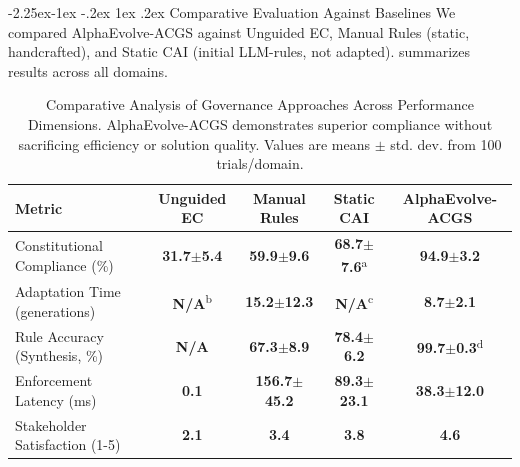 \documentclass[manuscript,screen,review,anonymous,9pt]{acmart}
\makeatletter
\renewcommand\subsection{\@startsection{subsection}{2}{\z@}%
  {-2.25ex\@plus -1ex \@minus -.2ex}%
  {1ex \@plus .2ex}%
  {\normalfont\large\bfseries}}
\newcommand{\tablesize}{\footnotesize}
\newcommand{\tablenumfmt}[1]{\textbf{#1}}
\newcommand{\tableheader}[1]{\textbf{#1}}
\makeatother
\begin{document}
\subsection{Comparative Evaluation Against Baselines}
\label{subsec:comparative_evaluation}
We compared AlphaEvolve-ACGS against Unguided EC, Manual Rules (static, handcrafted), and Static CAI (initial LLM-rules, not adapted).  summarizes results across all domains.
\begin{table}[htbp]
\centering
\caption{Comparative Analysis of Governance Approaches Across Performance Dimensions. AlphaEvolve-ACGS demonstrates superior compliance without sacrificing efficiency or solution quality. Values are means $\pm$ std. dev. from 100 trials/domain.}
\label{tab:baseline_comparison}
\tablesize
\begin{tabular}{@{}lcccc@{}}
\toprule
\tableheader{Metric} & \tableheader{Unguided EC} & \tableheader{Manual Rules} & \tableheader{Static CAI} & \tableheader{AlphaEvolve-ACGS} \\
\midrule
Constitutional Compliance (\%) & \tablenumfmt{31.7$\pm$5.4} & \tablenumfmt{59.9$\pm$9.6} & \tablenumfmt{68.7$\pm$7.6}\textsuperscript{a} & \textbf{\tablenumfmt{94.9$\pm$3.2}} \\
Adaptation Time (generations) & \tablenumfmt{N/A}\textsuperscript{b} & \tablenumfmt{15.2$\pm$12.3} & \tablenumfmt{N/A}\textsuperscript{c} & \textbf{\tablenumfmt{8.7$\pm$2.1}} \\
Rule Accuracy (Synthesis, \%) & \tablenumfmt{N/A} & \tablenumfmt{67.3$\pm$8.9} & \tablenumfmt{78.4$\pm$6.2} & \textbf{\tablenumfmt{99.7$\pm$0.3}}\textsuperscript{d} \\
Enforcement Latency (ms) & \tablenumfmt{0.1} & \tablenumfmt{156.7$\pm$45.2} & \tablenumfmt{89.3$\pm$23.1} & \textbf{\tablenumfmt{38.3$\pm$12.0}} \\
Stakeholder Satisfaction (1-5) & \tablenumfmt{2.1} & \tablenumfmt{3.4} & \tablenumfmt{3.8} & \textbf{\tablenumfmt{4.6}} \\
\bottomrule
\end{tabular}

\end{table}
\end{document}
